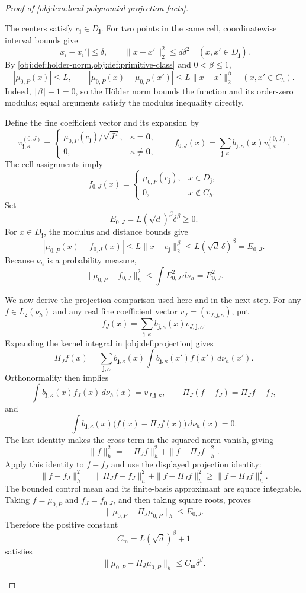 \begin{proof}[Proof of \cref{obj:lem:local-polynomial-projection-facts}]
\begin{enumerate}
The centers satisfy \(c_{\mathbf j}\in D_{\mathbf j}\).
For two points in the same cell, coordinatewise interval bounds give
\[
|x_i-x_i'|\le\delta,
\qquad
\|x-x'\|_2^2\le d\delta^2
\quad(x,x'\in D_{\mathbf j}).
\]
By \cref{obj:def:holder-norm,obj:def:primitive-class} and
\(0<\beta\le1\),
\[
|\mu_{0,P}(x)|\le L,
\qquad
|\mu_{0,P}(x)-\mu_{0,P}(x')|
 \le L\|x-x'\|_2^\beta
\quad(x,x'\in C_h).
\]
Indeed, \(\lceil\beta\rceil-1=0\), so the Hölder norm bounds the
function and its order-zero modulus; equal arguments satisfy the modulus
inequality directly.

Define the fine coefficient vector and its expansion by
\[
v^{(0,J)}_{\mathbf j,\kappa}=
\begin{cases}
\mu_{0,P}(c_{\mathbf j})/\sqrt{J^d},&\kappa=\mathbf0,\\
0,&\kappa\ne\mathbf0,
\end{cases}
\qquad
f_{0,J}(x)=
 \sum_{\mathbf j,\kappa}
 b_{\mathbf j,\kappa}(x)v^{(0,J)}_{\mathbf j,\kappa}.
\]
The cell assignments imply
\[
f_{0,J}(x)=
\begin{cases}
\mu_{0,P}(c_{\mathbf j}),&x\in D_{\mathbf j},\\
0,&x\notin C_h.
\end{cases}
\]
Set
\[
E_{0,J}=L(\sqrt d)^\beta\delta^\beta\ge0.
\]
For \(x\in D_{\mathbf j}\), the modulus and distance bounds give
\[
|\mu_{0,P}(x)-f_{0,J}(x)|
 \le L\|x-c_{\mathbf j}\|_2^\beta
 \le L(\sqrt d\,\delta)^\beta
 =E_{0,J}.
\]
Because \(\nu_h\) is a probability measure,
\[
\|\mu_{0,P}-f_{0,J}\|_h^2
 \le\int E_{0,J}^2\,d\nu_h=E_{0,J}^2.
\]

We now derive the projection comparison used here and in the next step.
For any \(f\in L_2(\nu_h)\) and any real fine coefficient vector
\(v_J=(v_{J,\mathbf j,\kappa})\), put
\[
f_J(x)=\sum_{\mathbf j,\kappa}
 b_{\mathbf j,\kappa}(x)v_{J,\mathbf j,\kappa}.
\]
Expanding the kernel integral in \cref{obj:def:projection} gives
\[
\Pi_Jf(x)=
 \sum_{\mathbf j,\kappa}b_{\mathbf j,\kappa}(x)
 \int b_{\mathbf j,\kappa}(x')f(x')\,d\nu_h(x').
\]
Orthonormality then implies
\[
\int b_{\mathbf j,\kappa}(x)f_J(x)\,d\nu_h(x)
 =v_{J,\mathbf j,\kappa},
\qquad
\Pi_J(f-f_J)=\Pi_Jf-f_J,
\]
and
\[
\int b_{\mathbf j,\kappa}(x)
       \bigl(f(x)-\Pi_Jf(x)\bigr)\,d\nu_h(x)=0.
\]
The last identity makes the cross term in the squared norm vanish, giving
\[
\|f\|_h^2=\|\Pi_Jf\|_h^2+\|f-\Pi_Jf\|_h^2.
\]
Apply this identity to \(f-f_J\) and use the displayed projection identity:
\[
\|f-f_J\|_h^2
 =\|\Pi_Jf-f_J\|_h^2+\|f-\Pi_Jf\|_h^2
 \ge\|f-\Pi_Jf\|_h^2.
\]
The bounded control mean and its finite-basis approximant are square
integrable. Taking \(f=\mu_{0,P}\) and \(f_J=f_{0,J}\), and then taking
square roots, proves
\[
\|\mu_{0,P}-\Pi_J\mu_{0,P}\|_h
 \le E_{0,J}.
\]
Therefore the positive constant
\[
C_{\mathrm m}=L(\sqrt d)^\beta+1
\]
satisfies
\[
\|\mu_{0,P}-\Pi_J\mu_{0,P}\|_h
 \le C_{\mathrm m}\delta^\beta.
\]


\end{enumerate}
\end{proof}

